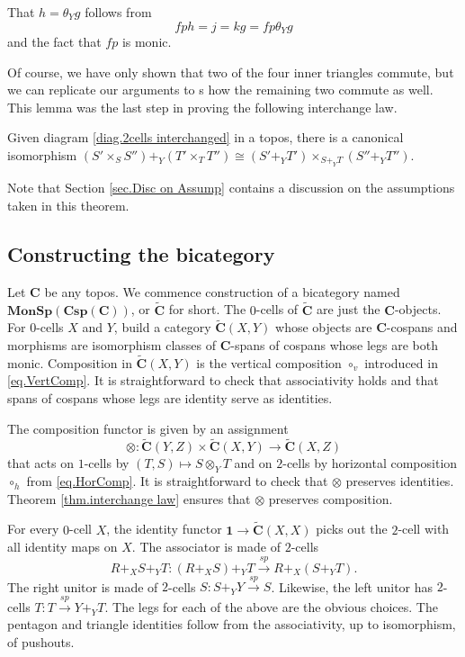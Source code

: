 \documentclass{tac}
\newcommand{\cat}[1]{\mathbf{#1}}
\newcommand{\from}{\colon}
\renewcommand{\span}{\xrightarrow{\mathit{sp}}}
\newcommand{\csC}{\widetilde{\mathbf{C}}}
\begin{document}
	That 
		$ h = \theta_Yg $ 
	follows from 
	\[
		f p h 
			= j
			= k g 
			= f p \theta_Y g
	\] 
	and the fact that $ f p $ is monic.
\endproof

Of course, we have only shown that 
two of the four inner triangles commute, 
but we can replicate our arguments to s
how the remaining two commute as well.  
This lemma was the last step in proving the following interchange law.

\theorem \label{thm.interchange law}
	Given diagram 
		\eqref{diag.2cells interchanged} 
	in a topos, there is a canonical isomorphism 
		$ ( S' \times_S S'' ) +_Y ( T' \times_T T'' ) 
			\cong 
			( S' +_Y T' ) \times_{ S +_Y T } ( S'' +_Y T'')$.
\endtheorem

Note that Section 
	\ref{sec.Disc on Assump}
contains a discussion on the assumptions
taken in this theorem.


\subsection{Constructing the bicategory}

Let $\cat{C}$ be any topos. 
We commence construction of a bicategory named 
	$ \cat{ Mon Sp ( Csp ( C ) ) } $, 
or $ \csC $ for short. 
The $0$-cells of $ \csC $ are just the $\cat{C}$-objects. 
For $0$-cells $X$ and $Y$, build a category $\csC(X,Y)$ 
whose objects are $\cat{C}$-cospans and 
morphisms are isomorphism classes of 
$\cat{C}$-spans of cospans whose legs are both monic. 
Composition in $ \csC ( X , Y )$ is the vertical composition $\circ_v$ 
introduced in 
	\eqref{eq.VertComp}. 
It is straightforward to check that associativity holds and 
that spans of cospans whose legs are identity serve as identities.

The composition functor is given by an assignment
\[
	\otimes \from 
		\csC(Y,Z) \times \csC(X,Y) 
		\to \csC(X,Z)
\]
that acts on $1$-cells by 
	$ ( T , S ) \mapsto S \otimes_Y T $ 
and on $2$-cells by horizontal composition $\circ_h$ from 
	\eqref{eq.HorComp}. 
It is straightforward to check that $\otimes$ preserves identities. 
Theorem 
	\ref{thm.interchange law} 
ensures that $\otimes$ preserves composition.

For every $0$-cell $X$, the identity functor 
	$ \cat{ 1 } \to \csC ( X , X ) $ 
picks out the $2$-cell with all identity maps on $X$. 
The associator is made of $2$-cells 
\[
	R +_X S +_Y T \from 
		( R +_X S ) +_Y T \span R +_X ( S +_Y T ) .
\] 
The right unitor is made of $2$-cells 
	$ S \from S +_Y Y \span S $. 
Likewise, the left unitor has $2$-cells 
	$ T \from T \span Y +_Y T $. 
The legs for each of the above are the obvious choices. 
The pentagon and triangle identities follow from 
the associativity, up to isomorphism, of pushouts. 
\end{document}
